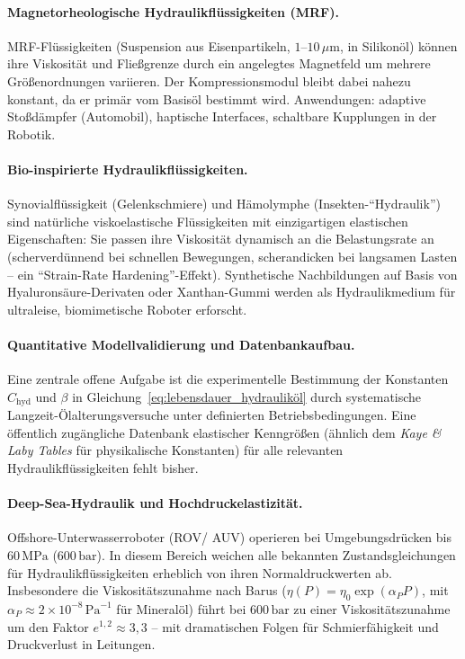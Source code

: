 ﻿\documentclass[a4paper,12pt]{scrreprt}
\theoremstyle{definition}
\begin{document}
\paragraph{Magnetorheologische Hydraulikflüssigkeiten (MRF).}
MRF-Flüssigkeiten (Suspension aus Eisenpartikeln, $1$--$10\,\mu\mathrm{m}$,
in Silikonöl) können ihre Viskosität und Fließgrenze durch ein angelegtes
Magnetfeld um mehrere Größenordnungen variieren. Der Kompressionsmodul
bleibt dabei nahezu konstant, da er primär vom Basisöl bestimmt wird.
Anwendungen: adaptive Stoßdämpfer (Automobil), haptische Interfaces,
schaltbare Kupplu\-ngen in der Robotik.

\paragraph{Bio-inspirierte Hydraulikflüssigkeiten.}
Synovialflüssigkeit (Gelenkschmiere) und Hämolymphe (Insekten-``Hydraulik'')
sind natürliche viskoelastische Flüssigkeiten mit einzigartigen elastischen
Eigenschaften: Sie passen ihre Viskosität dynamisch an die Belastungsrate
an (scherverdünnend bei schnellen Bewegungen, scherandicken bei langsamen
Lasten -- ein ``Strain-Rate Hardening''-Effekt). Synthetische Nachbildungen
auf Basis von Hyaluronsäure-Derivaten oder Xanthan-Gummi werden als
Hydraulikmedium für ultraleise, biomimetische Roboter erforscht.

\paragraph{Quantitative Modellvalidierung und Datenbankaufbau.}
Eine zentrale offene Aufgabe ist die experimentelle Bestimmung der
Konstanten $C_{\mathrm{hyd}}$ und $\beta$ in Gleichung~\eqref{eq:lebensdauer_hydrauliköl}
durch systematische Langzeit-Ölalterungsversuche unter definierten
Betriebsbedingungen. Eine öffentlich zugängliche Datenbank elastischer
Kenngrößen (ähnlich dem \emph{Kaye \& Laby Tables} für physikalische
Konstanten) für alle relevanten Hydraulikflüssigkeiten fehlt bisher.

\paragraph{Deep-Sea-Hydraulik und Hochdruckelastizität.}
Offshore-Unterwasserroboter (ROV\newline/ AUV) operieren bei Umgebungsdrücken
bis $60\,\mathrm{MPa}$ ($600\,\mathrm{bar}$). In diesem Bereich
weichen alle bekannten Zustandsgleichungen für Hydraulikflüssigkeiten
erheblich von ihren Normaldruckwerten ab. Insbesondere die
Viskositätszunahme nach Barus ($\eta(P) = \eta_0 \exp(\alpha_P P)$,
mit $\alpha_P \approx 2 \times 10^{-8}\,\mathrm{Pa}^{-1}$ für Mineralöl)
führt bei $600\,\mathrm{bar}$ zu einer Viskositätszunahme um den Faktor
$e^{1{,}2} \approx 3{,}3$ -- mit dramatischen Folgen für Schmierfähigkeit
und Druckverlust in Leitungen.
\end{document}
